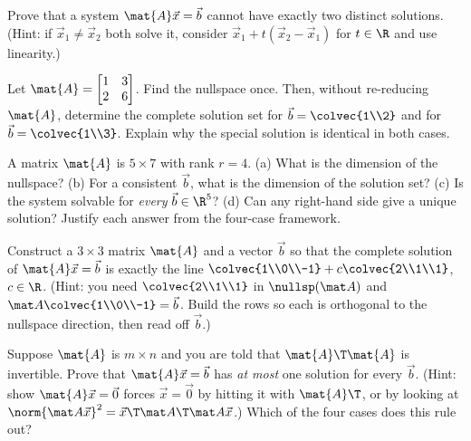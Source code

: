 \begin{exercise}
\label{ch13:ex-trichotomy}
Prove that a system $\mat{A}\vec{x}=\vec{b}$ cannot have exactly two distinct solutions.
(Hint: if $\vec{x}_1\neq\vec{x}_2$ both solve it, consider
$\vec{x}_1+t(\vec{x}_2-\vec{x}_1)$ for $t\in\R$ and use linearity.)
\end{exercise}

\begin{exercise}
\label{ch13:ex-reuse}
Let $\mat{A}=\begin{bmatrix}1&3\\2&6\end{bmatrix}$. Find the nullspace once. Then, without
re-reducing $\mat{A}$, determine the complete solution set for
$\vec{b}=\colvec{1\\2}$ and for $\vec{b}=\colvec{1\\3}$. Explain why the special solution is
identical in both cases.
\end{exercise}

\begin{exercise}
\label{ch13:ex-shape}
A matrix $\mat{A}$ is $5\times7$ with rank $r=4$. (a) What is the dimension of the nullspace?
(b) For a consistent $\vec{b}$, what is the dimension of the solution set? (c) Is the system
solvable for \emph{every} $\vec{b}\in\R^5$? (d) Can any right-hand side give a unique
solution? Justify each answer from the four-case framework.
\end{exercise}

\begin{exercise}
\label{ch13:ex-prescribe}
Construct a $3\times3$ matrix $\mat{A}$ and a vector $\vec{b}$ so that the complete solution
of $\mat{A}\vec{x}=\vec{b}$ is exactly the line
$\colvec{1\\0\\-1}+c\colvec{2\\1\\1}$, $c\in\R$. (Hint: you need
$\colvec{2\\1\\1}$ in $\nullsp(\mat A)$ and $\mat A\colvec{1\\0\\-1}=\vec b$. Build the rows
so each is orthogonal to the nullspace direction, then read off $\vec b$.)
\end{exercise}

\begin{exercise}
\label{ch13:ex-criterion}
Suppose $\mat{A}$ is $m\times n$ and you are told that $\mat{A}\T\mat{A}$ is invertible.
Prove that $\mat{A}\vec{x}=\vec{b}$ has \emph{at most} one solution for every $\vec{b}$.
(Hint: show $\mat{A}\vec{x}=\vec 0$ forces $\vec{x}=\vec 0$ by hitting it with $\mat{A}\T$,
or by looking at $\norm{\mat A\vec x}^2=\vec x\T\mat A\T\mat A\vec x$.) Which of the four
cases does this rule out?
\end{exercise}
